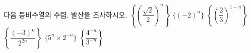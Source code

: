 다음 등비수열의 수렴, 발산을 조사하시오.
 $\left\{\left(\dfrac{\sqrt{2}}{2}\right)^n\right\}$
 $\{(-2)^n\}$
 $\left\{\left(\dfrac{2}{3}\right)^{1-n}\right\}$
 $\left\{\dfrac{(-3)^n}{2^{2n}}\right\}$
 $\{5^n\times 2^{-n}\}$
 $\left\{\dfrac{4^{-n}}{3^{-n}}\right\}$
